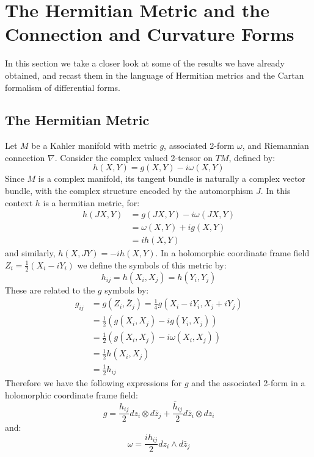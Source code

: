 \documentclass[11pt]{amsart}
\theoremstyle{definition}
\begin{document}
\parskip 6pt
\parindent 0pt
\baselineskip 14pt

\section{ The Hermitian Metric and the Connection and Curvature Forms }

In this section we take a closer look at some of the results we have already obtained, and recast them in the language of Hermitian metrics and the Cartan formalism of differential forms.

\subsection{ The Hermitian Metric }

Let $M$ be a Kahler manifold with metric $g$, associated 2-form $\omega$, and Riemannian connection $\nabla$.  Consider the complex valued 2-tensor on $TM$, defined by:
%
$$ h(X,Y) = g(X,Y) - i \omega(X,Y) $$
%
Since $M$ is a complex manifold, its tangent bundle is naturally a complex vector bundle, with the complex structure encoded by the automorphism $J$.  In this context $h$ is a hermitian metric, for:
%
\begin{align*}
h(JX,Y) &= g(JX,Y) - i \omega( JX, Y ) \\
&= \omega( X, Y ) + i g( X, Y ) \\
&= i h(X,Y)
\end{align*}
%
and similarly, $ h(X,JY) = - ih(X,Y) $.  In a holomorphic coordinate frame field $Z_i = \frac{1}{2}(X_i - i Y_i)$ we define the symbols of this metric by:
%
$$h_{ij} = h( X_i, X_j ) = h( Y_i, Y_j )$$
%
These are related to the $g$ symbols by:
%
\begin{align*}
g_{ij} &= g( Z_i, \bar{Z}_j ) = \frac{1}{4}g( X_i - i Y_i, X_j + i Y_j ) \\
&= \frac{1}{2}( g(X_i, X_j) - i g( Y_i, X_j ) ) \\
&= \frac{1}{2}( g(X_i, X_j) - i \omega( X_i, X_j ) ) \\
&= \frac{1}{2} h( X_i, X_j ) \\
&= \frac{1}{2} h_{ij}
\end{align*}
%
Therefore we have the following expressions for $g$ and the associated 2-form in a holomorphic coordinate frame field:
%
$$ g = \frac{ h_{ij} }{2}  d z_i \otimes d \bar{z}_j + \frac{ \bar{h}_{ij} }{2} d \bar{z}_i \otimes d z_i  $$
%
and:
%
$$ \omega = \frac{i h_{ij} }{2} d z_i \wedge d \bar{z}_j $$
\end{document}
